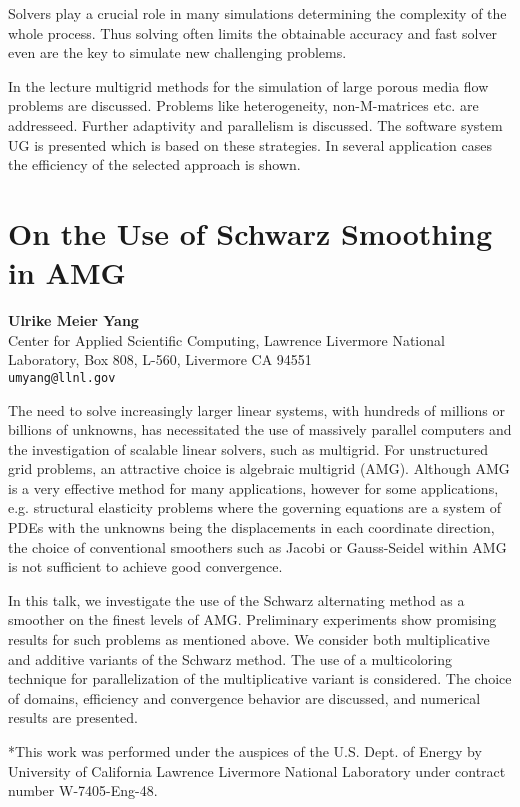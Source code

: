 \documentclass[11pt]{article}
\newcommand{\nextab}[4]{
	\section{#2}
	{\bf #1} \\ \nopagebreak
	{#3} \\ \nopagebreak
	{\tt #4} \nopagebreak
	}
\begin{document}
Solvers play a crucial role in many simulations
determining the complexity of the whole process. Thus
solving often limits the obtainable accuracy and fast
solver even are the key to simulate new challenging
problems.

In the lecture multigrid methods for the simulation of
large porous media flow problems are discussed.  Problems
like heterogeneity, non-M-matrices etc. are addresseed.
Further adaptivity and parallelism is discussed. The software
system UG is presented which is based on these
strategies. In several application cases the efficiency of
the selected approach is shown.




\nextab
{Ulrike Meier Yang}
{On the Use of Schwarz Smoothing in AMG}
{Center for Applied Scientific Computing, Lawrence Livermore National Laboratory, Box 808, L-560, Livermore CA 94551}
{umyang@llnl.gov}


The need to solve increasingly larger linear systems, with hundreds of
millions or billions of unknowns, has necessitated the use of massively
parallel computers and the investigation of scalable linear solvers, such as
multigrid. For unstructured grid problems, an attractive choice is
algebraic multigrid (AMG). Although AMG is a very effective method for
many applications, however for some applications, e.g. structural elasticity
problems where the governing equations are a system of PDEs with the unknowns
being the displacements in each coordinate direction, the choice of
conventional smoothers such as Jacobi or Gauss-Seidel within AMG is not
sufficient to achieve good convergence.


In this talk, we investigate the use of the Schwarz alternating method as a
smoother on the finest levels of AMG. Preliminary experiments show promising
results for such problems as mentioned above. We consider both multiplicative
and additive variants of the Schwarz method. The use of a multicoloring
technique for parallelization of the multiplicative variant is considered.
The choice of domains, efficiency and convergence behavior are discussed,
and numerical results are presented.


*This work was performed under the auspices of the U.S. Dept. of Energy
by University of California Lawrence Livermore National Laboratory under
contract number W-7405-Eng-48.
\end{document}
